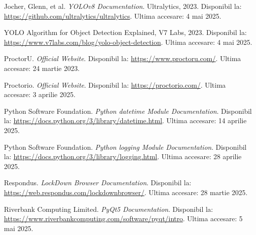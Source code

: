 \documentclass[12pt,a4paper]{article}
\begin{document}
\begin{thebibliography}{9}
Jocher, Glenn, et al. 
\textit{YOLOv8 Documentation}. 
Ultralytics, 2023. 
Disponibil la: \url{https://github.com/ultralytics/ultralytics}. 
Ultima accesare: 4 mai 2025.

YOLO Algorithm for Object Detection Explained,
V7 Labs,
2023.
Disponibil la: \url{https://www.v7labs.com/blog/yolo-object-detection}.
Ultima accesare: 4 mai 2025.

ProctorU. 
\textit{Official Website}. 
Disponibil la: \url{https://www.proctoru.com/}. 
Ultima accesare: 24 martie 2023.

Proctorio. 
\textit{Official Website}. 
Disponibil la: \url{https://proctorio.com/}. 
Ultima accesare: 3 aprilie 2025.

Python Software Foundation. 
\textit{Python datetime Module Documentation}. 
Disponibil la: \url{https://docs.python.org/3/library/datetime.html}. 
Ultima accesare: 14 aprilie 2025.

Python Software Foundation. 
\textit{Python logging Module Documentation}. 
Disponibil la: \url{https://docs.python.org/3/library/logging.html}. 
Ultima accesare: 28 aprilie 2025.

Respondus. 
\textit{LockDown Browser Documentation}. 
Disponibil la: \url{https://web.respondus.com/lockdownbrowser/}. 
Ultima accesare: 28 martie 2025.

Riverbank Computing Limited. 
\textit{PyQt5 Documentation}. 
Disponibil la: \url{https://www.riverbankcomputing.com/software/pyqt/intro}. 
Ultima accesare: 5 mai 2025.

\end{thebibliography}
\end{document}
